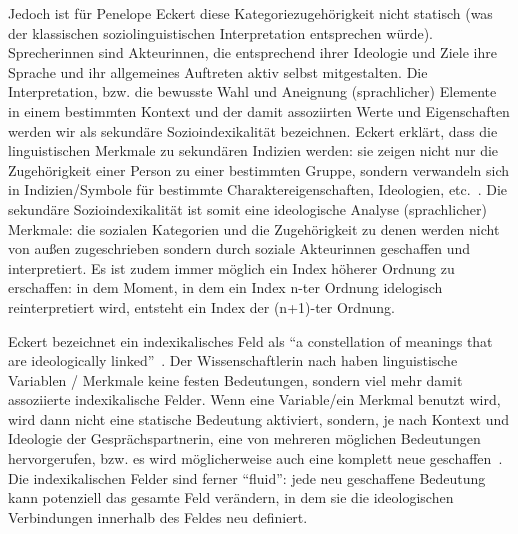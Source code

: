 Jedoch ist für Penelope Eckert diese Kategoriezugehörigkeit nicht statisch (was der klassischen soziolinguistischen Interpretation entsprechen würde). %
Sprecherinnen sind Akteurinnen, die entsprechend ihrer Ideologie und Ziele ihre Sprache und ihr allgemeines Auftreten aktiv selbst mitgestalten.
Die Interpretation, bzw. die bewusste Wahl und Aneignung (sprachlicher) Elemente in einem bestimmten Kontext und der damit assoziirten Werte und Eigenschaften werden wir als sekundäre Sozioindexikalität bezeichnen.
Eckert erklärt, dass die linguistischen Merkmale zu sekundären Indizien werden: sie zeigen nicht nur die Zugehörigkeit einer Person zu einer bestimmten Gruppe, sondern verwandeln sich in Indizien/Symbole für bestimmte Charaktereigenschaften, Ideologien, etc.~\cite{Eckert08}. %
Die sekundäre Sozioindexikalität ist somit eine ideologische Analyse (sprachlicher) Merkmale: die sozialen Kategorien und die Zugehörigkeit zu denen werden nicht von außen zugeschrieben sondern durch soziale Akteurinnen geschaffen und interpretiert.
Es ist zudem immer möglich ein Index höherer Ordnung zu erschaffen: in dem Moment, in dem ein Index n-ter Ordnung idelogisch reinterpretiert wird, entsteht ein Index der (n+1)-ter Ordnung.


Eckert bezeichnet ein indexikalisches Feld als ``a constellation of meanings that are ideologically linked''~\cite{Eckert08}. %
Der Wissenschaftlerin nach haben linguistische Variablen / Merkmale keine festen Bedeutungen, sondern viel mehr damit assoziierte indexikalische Felder.
Wenn eine Variable/ein Merkmal benutzt wird, wird dann nicht eine statische Bedeutung aktiviert, sondern, je nach Kontext und Ideologie der Gesprächspartnerin, eine von mehreren möglichen Bedeutungen hervorgerufen, bzw. es wird möglicherweise auch eine komplett neue geschaffen~\cite{Eckert08}. %
Die indexikalischen Felder sind ferner ``fluid'': jede neu geschaffene Bedeutung kann potenziell das gesamte Feld verändern, in dem sie die ideologischen Verbindungen innerhalb des Feldes neu definiert. %

